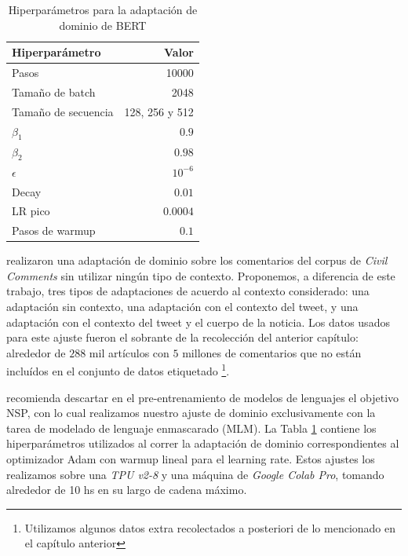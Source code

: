 \begin{table}[t]
    \centering
    \begin{tabular}{lr}
        \toprule
        Hiperparámetro & Valor         \\
        \midrule
        Pasos               & \num{10000}           \\
        Tamaño de batch     & \num{2048}            \\
        Tamaño de secuencia & 128, 256 y 512  \\
        $\beta_1$           & $0.9$           \\
        $\beta_2$           & $0.98$          \\
        $\epsilon$          & $10^{-6}$       \\
        Decay               & $0.01$          \\
        LR pico             & $0.0004$     \\
        Pasos de warmup     & $0.1$             \\
        \bottomrule
    \end{tabular}
    \caption{Hiperparámetros para la adaptación de dominio de BERT}
    \label{tab:hs_ft_hyperparameter}
\end{table}


\citet{pavlopoulos2020toxicity} realizaron una adaptación de dominio sobre los comentarios del corpus de \emph{Civil Comments} sin utilizar ningún tipo de contexto. Proponemos, a diferencia de este trabajo, tres tipos de adaptaciones de acuerdo al contexto considerado: una adaptación sin contexto, una adaptación con el contexto del tweet, y una adaptación con el contexto del tweet y el cuerpo de la noticia. Los datos usados para este ajuste fueron el sobrante de la recolección del anterior capítulo: alrededor de $288$ mil artículos con $5$ millones de comentarios que no están incluídos en el conjunto de datos etiquetado \footnote{Utilizamos algunos datos extra recolectados a posteriori de lo mencionado en el capítulo anterior}.



\citet{liu2019roberta} recomienda descartar en el pre-entrenamiento de modelos de lenguajes el objetivo NSP, con lo cual realizamos nuestro ajuste de dominio exclusivamente con la tarea de modelado de lenguaje enmascarado (MLM). La Tabla \ref{tab:hs_ft_hyperparameter} contiene los hiperparámetros utilizados al correr la adaptación de dominio correspondientes al optimizador Adam con warmup lineal para el learning rate. Estos ajustes los realizamos sobre una \emph{TPU v2-8} y una máquina de \emph{Google Colab Pro}, tomando alrededor de 10 hs en su largo de cadena máximo.

